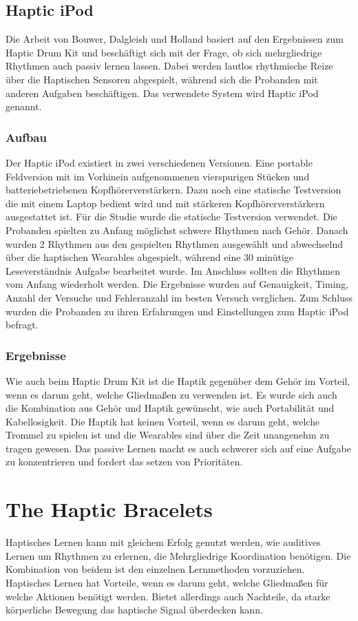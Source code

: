 \documentclass[ngerman,runningheads,a4paper]{llncs}
\begin{document}
\subsection{Haptic iPod}
Die Arbeit von Bouwer, Dalgleish und Holland\cite{bouwer2011haptic} basiert auf den Ergebnissen zum Haptic Drum Kit \cite{10.1145/1709886.1709892} und beschäftigt sich mit der Frage, ob sich mehrgliedrige Rhythmen auch passiv lernen lassen.
Dabei werden lautlos rhythmische Reize über die Haptischen Sensoren abgespielt, während sich die Probanden mit anderen Aufgaben beschäftigen.
Das verwendete System wird Haptic iPod genannt.
\subsubsection{Aufbau}
Der Haptic iPod existiert in zwei verschiedenen Versionen.
Eine portable Feldversion mit im Vorhinein aufgenommenen vierspurigen Stücken und batteriebetriebenen Kopfhörerverstärkern.
Dazu noch eine statische Testversion die mit einem Laptop bedient wird und mit stärkeren Kopfhörerverstärkern ausgestattet ist.
Für die Studie wurde die statische Testversion verwendet.
Die Probanden spielten zu Anfang möglichst schwere Rhythmen nach Gehör.
Danach wurden 2 Rhythmen aus den gespielten Rhythmen ausgewählt und abwechselnd über die haptischen Wearables abgespielt, während eine 30 minütige Leseverständnis Aufgabe bearbeitet wurde.
Im Anschluss sollten die Rhythmen vom Anfang wiederholt werden.
Die Ergebnisse wurden auf Genauigkeit, Timing, Anzahl der Versuche und Fehleranzahl im besten Versuch verglichen.
Zum Schluss wurden die Probanden zu ihren Erfahrungen und Einstellungen zum Haptic iPod befragt.

\subsubsection{Ergebnisse}
Wie auch beim Haptic Drum Kit \cite{10.1145/1709886.1709892} ist die Haptik gegenüber dem Gehör im Vorteil, wenn es darum geht, welche Gliedmaßen zu verwenden ist.
Es wurde sich auch die Kombination aus Gehör und Haptik gewünscht, wie auch Portabilität und Kabellosigkeit.
Die Haptik hat keinen Vorteil, wenn es darum geht, welche Trommel zu spielen ist und die Wearables sind über die Zeit unangenehm zu tragen gewesen.
Das passive Lernen macht es auch schwerer sich auf eine Aufgabe zu konzentrieren und fordert das setzen von Prioritäten.

\section{The Haptic Bracelets}
Haptisches Lernen kann mit gleichem Erfolg genutzt werden, wie auditives Lernen um Rhythmen zu erlernen, die Mehrgliedrige Koordination benötigen.
Die Kombination von beidem ist den einzelnen Lernmethoden vorzuziehen.
Haptisches Lernen hat Vorteile, wenn es darum geht, welche Gliedmaßen für welche Aktionen benötigt werden.
Bietet allerdings auch Nachteile, da starke körperliche Bewegung das haptische Signal überdecken kann. \cite{bouwer2013haptic}
\end{document}
